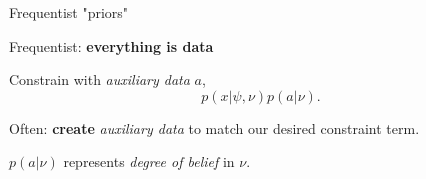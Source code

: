 \documentclass[
aspectratio=169,
14pt,
professionalfonts
]{beamer}
\begin{document}
\begin{frame}{Frequentist "priors"}
    \vspace{-0.5cm}
    \begin{minipage}{0.7\textwidth}
        \begin{center}
            Frequentist: \textbf{everything is data}
        \end{center}

        Constrain with \textit{auxiliary data} $a$,
        $$p(x| \psi, \nu) p(a| \nu).$$
        
        Often: \textbf{create} \textit{auxiliary data} to match our desired constraint term.

        \vspace{0.5cm}

        $p(a| \nu)$ represents \textit{degree of belief} in $\nu$.


\end{minipage}
\end{frame}
\end{document}
